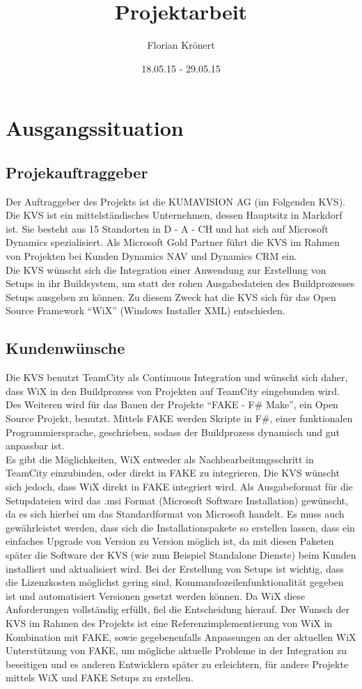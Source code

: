 \documentclass[10pt,a4paper, twoside]{article}
\title{Projektarbeit}
\date{18.05.15 - 29.05.15}
\author{Florian Krönert}
\begin{document}

\thispagestyle{empty}
\cleardoublepage
{}
\tableofcontents{}
\listoffigures
{}
\listoftables
\newpage
{}
\section{Ausgangssituation}
\subsection{Projekauftraggeber}
Der Auftraggeber des Projekts ist die KUMAVISION AG (im Folgenden KVS).
Die KVS ist ein mittelständisches Unternehmen, dessen Hauptsitz in Markdorf ist.
Sie besteht aus 15 Standorten in D - A - CH und hat sich auf Microsoft Dynamics spezialisiert.
Als Microsoft Gold Partner führt die KVS im Rahmen von Projekten bei Kunden Dynamics NAV und Dynamics CRM ein.\\[1ex]
Die KVS wünscht sich die Integration einer Anwendung zur Erstellung von Setups in ihr Buildsystem, um statt der rohen Ausgabedateien des Buildprozesses Setups ausgeben zu können.
Zu diesem Zweck hat die KVS sich für das Open Source Framework "`WiX"' (Windows Installer XML) entschieden. 
\subsection{Kundenwünsche}
Die KVS benutzt TeamCity als Continuous Integration und wünscht sich daher, dass WiX in den Buildprozess von Projekten auf TeamCity eingebunden wird.
Des Weiteren wird für das Bauen der Projekte "`FAKE - F\# Make"', ein Open Source Projekt, benutzt.
Mittels FAKE werden Skripte in F\#, einer funktionalen Programmiersprache, geschrieben, sodass der Buildprozess dynamisch und gut anpassbar ist.\\[1ex]
Es gibt die Möglichkeiten, WiX entweder als Nachbearbeitungsschritt in TeamCity einzubinden, oder direkt in FAKE zu integrieren.
Die KVS wünscht sich jedoch, dass WiX direkt in FAKE integriert wird.
Als Ausgabeformat für die Setupdateien wird das .msi Format (Microsoft Software Installation) gewünscht, da es sich hierbei um das Standardformat von Microsoft handelt.
Es muss auch gewährleistet werden, dass sich die Installationspakete so erstellen lassen, dass ein einfaches Upgrade von Version zu Version möglich ist, da mit diesen Paketen später die Software der KVS (wie zum Beispiel Standalone Dienste) beim Kunden installiert und aktualisiert wird.
Bei der Erstellung von Setups ist wichtig, dass die Lizenzkosten möglichst gering sind, Kommandozeilenfunktionalität gegeben ist und automatisiert Versionen gesetzt werden können.
Da WiX diese Anforderungen vollständig erfüllt, fiel die Entscheidung hierauf.
Der Wunsch der KVS im Rahmen des Projekts ist eine Referenzimplementierung von WiX in Kombination mit FAKE, sowie gegebenenfalls Anpassungen an der aktuellen WiX Unterstützung von FAKE, um mögliche aktuelle Probleme in der Integration zu beseitigen und es anderen Entwicklern später zu erleichtern, für andere Projekte mittels WiX und FAKE Setups zu erstellen.
\end{document}
